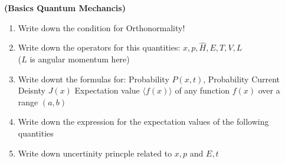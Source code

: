 \documentclass{article}[12pt, a4paper]
\begin{document}

\centering \textbf{(Basics Quantum Mechancis)}
\begin{enumerate}
\item Write down the condition for Orthonormality!
\item Write down the operators for this quantities: $x, p, \hat{H}, E, T, V, L$ \\
($L$ is angular momentum here)
\item Write downt the formulas for: Probability $P(x, t)$, Probability Current Deisnty $J(x)$
Expectation value $\langle f(x) \rangle$ of any function $f(x)$ over a range $(a, b)$
\item Write down the expression for the expectation values of the following quantities
\item Write down uncertinity princple related to $x, p$ and $E, t$
\end{enumerate}
\end{document}

